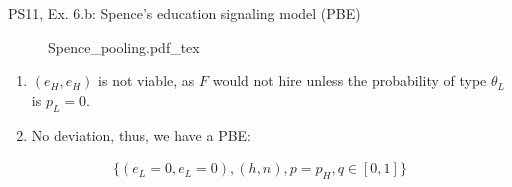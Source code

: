 \begin{frame}{PS11, Ex. 6.b: Spence’s education signaling model (PBE)}
\begin{multicols}{2}
\begin{figure}[!h]
        \center{}
        {Spence_pooling.pdf_tex}
      \end{figure}\vspace{-6pt}
      \begin{enumerate}
        \item $(e_H,e_H)$ is not viable, as $F$ would not hire unless the probability of type $\theta_L$ is $p_L=0$.
        \item No deviation, thus, we have a PBE:
      \end{enumerate}\vspace{-12pt}
      \begin{align*}
        \{(e_L=0,e_L=0),(h,n),p=p_H,q\in[0,1]\}
      \end{align*}
      \vfill\null
    \end{multicols}
\end{frame}
